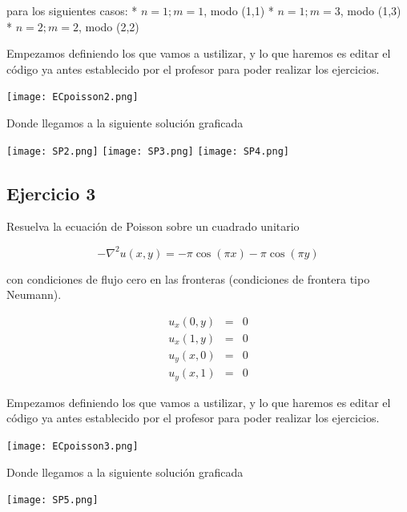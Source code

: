 \documentclass[12pt]{article}
\begin{document}
para los siguientes casos: 
* $n=1; m=1$, modo (1,1)
* $n=1; m=3$, modo (1,3)
* $n=2; m=2$, modo (2,2)

Empezamos definiendo los que vamos a ustilizar, y lo que haremos es editar el código ya antes establecido por el profesor para poder realizar los ejercicios.

\begin{center}
    \texttt{[image: ECpoisson2.png]}
    
    Donde llegamos a la siguiente solución graficada
    
    \texttt{[image: SP2.png]}
    \texttt{[image: SP3.png]}
    \texttt{[image: SP4.png]}
    
\end{center}


\subsection*{Ejercicio 3}

Resuelva la ecuación de Poisson sobre un cuadrado unitario 

\begin{equation*}
- \nabla^2 u(x,y)  =  - \pi \cos(\pi x) - \pi \cos (\pi y) 
\end{equation*}

con condiciones de flujo cero en las fronteras (condiciones de frontera tipo Neumann). 

\begin{eqnarray*}
u_x(0,y) & = & 0 \\
u_x(1,y) & = & 0 \\
u_y(x,0) & = & 0 \\
u_y(x,1) & = & 0
\end{eqnarray*}

Empezamos definiendo los que vamos a ustilizar, y lo que haremos es editar el código ya antes establecido por el profesor para poder realizar los ejercicios.

\begin{center}
    \texttt{[image: ECpoisson3.png]}
    
    Donde llegamos a la siguiente solución graficada
    
    \texttt{[image: SP5.png]}
    
\end{center}

\end{document}
